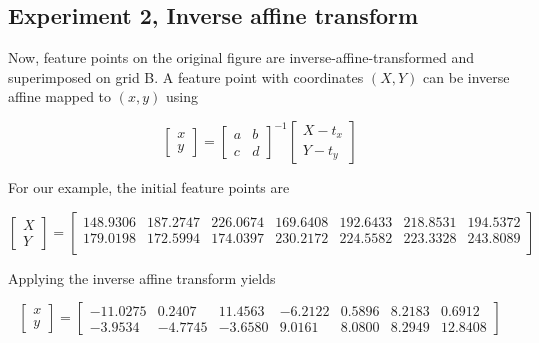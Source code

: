 \subsection{Experiment 2, Inverse affine transform}
Now, feature points on the original figure are inverse-affine-transformed and superimposed on grid B.  A feature point with coordinates $(X,Y)$ can be inverse affine mapped to $(x,y)$ using

\begin{equation}
\left[\begin{array}{ccc}
x 
\\ 
y
\end{array}
\right]
=
\left[\begin{array}{ccc}
a & b\\ 
c & d
\end{array}
\right]^{-1}
\left[\begin{array}{ccc}
X - t_x  
\\ 
Y - t_y
\end{array}
\right]
\end{equation}

For our example, the initial feature points are 

\begin{equation*}
\left[\begin{array}{ccc}
X  
\\ 
Y
\end{array}
\right]=
\left[
\begin{array}{cccccccc}
148.9306 & 187.2747 & 226.0674 & 169.6408 & 192.6433 & 218.8531 & 194.5372\\
179.0198 & 172.5994 & 174.0397 & 230.2172 & 224.5582 & 223.3328 & 243.8089\\
\end{array}
\right]
\end{equation*}

Applying the inverse affine transform yields

\begin{equation*}
\left[\begin{array}{ccc}
x  
\\ 
y
\end{array}
\right]=
\left[
\begin{array}{rrrrrrrrrrr}
  -11.0275 &   0.2407 &  11.4563 &  -6.2122  &  0.5896 &   8.2183 &   0.6912\\
   -3.9534  & -4.7745  & -3.6580  &  9.0161  &  8.0800  &  8.2949  & 12.8408
\end{array}
\right]
\end{equation*}


